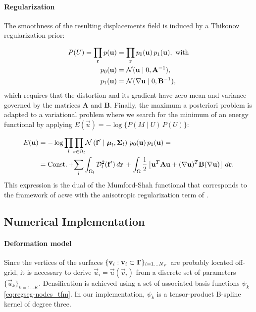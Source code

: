 \paragraph*{Regularization}
The smoothness of the resulting displacements field is induced by a Thikonov regularization
  prior:

  \begin{align}
  P(U) = \underset{\vec{r}}{\prod}\, p(\vec{u}) &=
  \underset{\vec{r}}{\prod}\, p_0(\vec{u}) \, p_1(\vec{u}), \text{ with} \\
  p_0(\vec{u}) &= \mathcal{N}( \vec{u} \mid 0, \mathbf{A}^{-1}), \notag\\
  p_1(\vec{u}) &= \mathcal{N}(  \nabla \vec{u} \mid 0, \mathbf{B}^{-1}),
  \label{eq:regseg-thikonov}
  \end{align}
 which requires that the distortion and its gradient have zero
  mean and variance governed by the matrices $\mathbf{A}$ and $\mathbf{B}$.
Finally, the maximum a posteriori problem is adapted to a variational problem where we search for
  the minimum of an energy functional by applying $E(\vec{u}) = -\log \{P( M \mid U) \, P(U)\}$:

  \begin{align}
  E(\vec{u}) &= -\log \underset{l}{\prod}
  \underset{\vec{r} \in \Omega_l}{\prod}
  \mathcal{N} \left( \vec{f}' \mid \boldsymbol{\mu}_l, \boldsymbol{\Sigma}_l \right)\,p_0( \vec{u})\,p_1( \vec{u}) = \notag\\ &=
  \const + \underset{l}{\sum} \int_{\Omega_l} \mdist{f'}{l} \,d\vec{r} \, +   \int_{\Omega} \frac12 \left[ \vec{u}^T \mathbf{A} \vec{u} + (\nabla \vec{u})^T \mathbf{B} (\nabla \vec{u}) \right] \,d\vec{r}.
  \label{eq:regseg-energy}
  \end{align}
This expression is the dual of the Mumford-Shah functional that corresponds
  to the framework of \acrlong*{acwe} \citep{chan_active_2001}
  with the anisotropic regularization term of \cite{nagel_investigation_1986}.


\subsection{Numerical Implementation}
\label{sec:regseg-numerical_implementation}

\paragraph*{Deformation model}\label{sec:regseg-deformation_model}
Since the vertices of the surfaces $\{\mathbf{v}_i: \mathbf{v}_i \subset \boldsymbol{\Gamma} \}_{i=1 \ldots N_V}$
  are probably located off-grid, it is necessary to derive $\vec{u}_i = \vec{u}(\vec{v}_i)$ from a discrete set of parameters
  $\{\vec{u}_k\}_{k=1 \ldots K}$.
Densification is achieved using a set of associated basis functions $\psi_k$ \eqref{eq:regseg-nodes_tfm}.
In our implementation, $\psi_k$ is a tensor-product B-spline kernel of degree three.

